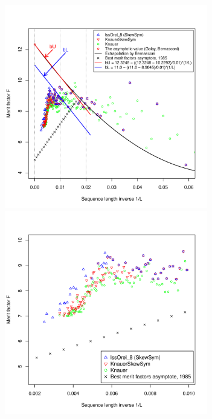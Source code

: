 \begin{figure}[t!]
\centering
\vspace*{-5ex}%

\includegraphics[width=0.79\textwidth]{fg-R-labs-wide-4-figures-b}
\vspace*{-5ex}%
\\
\includegraphics[width=0.79\textwidth]{fg-R-labs-wide-4-figures-c}

\end{figure}
